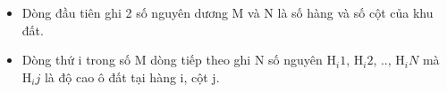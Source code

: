 \begin{itemize}
	\item Dòng đầu tiên ghi 2 số nguyên dương M và N là số hàng và số cột của khu đất.
	\item Dòng thứ i trong số M dòng tiếp theo ghi N số nguyên H$_i1$, H$_i2$, .., H$_iN $ mà H$_ij $ là độ cao ô đất tại hàng i, cột j.
\end{itemize}
